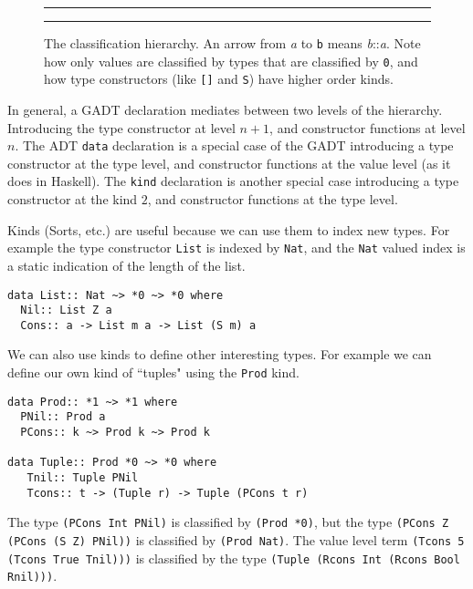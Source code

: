 \documentclass[11pt,twoside]{article}
\begin{document}
\begin{figure}
\hrule
\begin{center}
\end{center}
\vspace*{-.25in}
\caption{The classification hierarchy. 
An arrow from {\it a} to {\tt b} means {\it b}::{\it a}.
Note how only values are classified by types that are classified by
{\tt *0}, and how type constructors (like {\tt []} and {\tt S})
have higher order kinds.}
\hrule
\label{Kindtree}
\end{figure}

In general, a GADT declaration mediates between two levels of the hierarchy.
Introducing the type constructor at level $n+1$, and constructor functions at
level $n$. The ADT {\tt data} declaration is a special case of the GADT
introducing a type constructor at the type level, and constructor functions at the
value level (as it does in Haskell). The {\tt kind} declaration is another
special case introducing a type constructor at the kind $2$, and constructor
functions at the type level.



Kinds (Sorts, etc.) are useful because we can use them to index new types. For example
the type constructor {\tt List} is indexed by {\tt Nat}, and the {\tt Nat} valued
index is a static indication of the length of the list.
\begin{verbatim}
data List:: Nat ~> *0 ~> *0 where 
  Nil:: List Z a
  Cons:: a -> List m a -> List (S m) a
\end{verbatim}
We can also use kinds to define other interesting types. For example
we can define our own kind of ``tuples" using the {\tt Prod} kind.
\begin{verbatim}
data Prod:: *1 ~> *1 where
  PNil:: Prod a
  PCons:: k ~> Prod k ~> Prod k
 
data Tuple:: Prod *0 ~> *0 where 
   Tnil:: Tuple PNil
   Tcons:: t -> (Tuple r) -> Tuple (PCons t r) 
\end{verbatim}
The type \verb+(PCons Int PNil)+ is classified
by \verb+(Prod *0)+, but the type \verb+(PCons Z (PCons (S Z) PNil))+ is classified
by \verb+(Prod Nat)+. The value level term \verb+(Tcons 5 (Tcons True Tnil)))+ is
classified by the type \verb+(Tuple (Rcons Int (Rcons Bool Rnil)))+.
\end{document}
